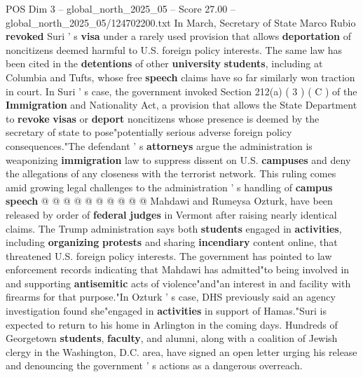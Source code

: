 \begin{textsample}{POS Dim 3 – global\_north\_2025\_05 – Score 27.00 – global\_north\_2025\_05/124702200.txt}
In March, Secretary of State Marco Rubio \textbf{revoked} Suri ' s \textbf{visa} under a rarely used provision that allows \textbf{deportation} of noncitizens deemed harmful to U.S. foreign policy interests.
The same law has been cited in the \textbf{detentions} of other \textbf{university} \textbf{students}, including at Columbia and Tufts, whose free \textbf{speech} claims have so far similarly won traction in court.
In Suri ' s case, the government invoked Section 212(a) ( 3 ) ( C ) of the \textbf{Immigration} and Nationality Act, a provision that allows the State Department to \textbf{revoke} \textbf{visas} or \textbf{deport} noncitizens whose presence is deemed by the secretary of state to pose"potentially serious adverse foreign policy consequences."The defendant ' s \textbf{attorneys} argue the administration is weaponizing \textbf{immigration} law to suppress dissent on U.S. \textbf{campuses} and deny the allegations of any closeness with the terrorist network.
This ruling comes amid growing legal challenges to the administration ' s handling of \textbf{campus} \textbf{speech} @ @ @ @ @ @ @ @ @ @ Mahdawi and Rumeysa Ozturk, have been released by order of \textbf{federal} \textbf{judges} in Vermont after raising nearly identical claims.
The Trump administration says both \textbf{students} engaged in \textbf{activities}, including \textbf{organizing} \textbf{protests} and sharing \textbf{incendiary} content online, that threatened U.S. foreign policy interests.
The government has pointed to law enforcement records indicating that Mahdawi has admitted"to being involved in and supporting \textbf{antisemitic} acts of violence"and"an interest in and facility with firearms for that purpose."In Ozturk ' s case, DHS previously said an agency investigation found she"engaged in \textbf{activities} in support of Hamas."Suri is expected to return to his home in Arlington in the coming days.
Hundreds of Georgetown \textbf{students}, \textbf{faculty}, and alumni, along with a coalition of Jewish clergy in the Washington, D.C. area, have signed an open letter urging his release and denouncing the government ' s actions as a dangerous overreach.

\end{textsample}
